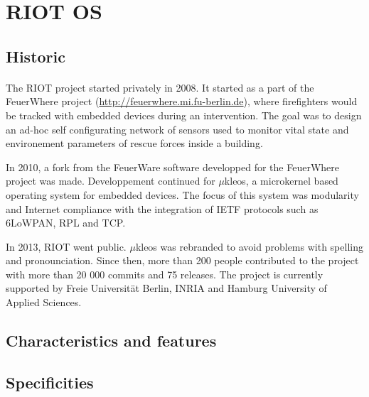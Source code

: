 \section{RIOT OS}

\subsection{Historic}
\paragraph{}
The RIOT project started privately in 2008.
It started as a part of the FeuerWhere project (\url{http://feuerwhere.mi.fu-berlin.de}), where firefighters would be tracked with embedded devices during an intervention.
The goal was to design an ad-hoc self configurating network of sensors used to monitor vital state and environement parameters of rescue forces inside a building.

In 2010, a fork from the FeuerWare software developped for the FeuerWhere project was made.
Developpement continued for $\mu$kleos, a microkernel based operating system for embedded devices.
The focus of this system was modularity and Internet compliance with the integration of IETF protocols such as 6LoWPAN, RPL and TCP.

In 2013, RIOT went public.
$\mu$kleos was rebranded to avoid problems with spelling and pronounciation.
Since then, more than 200 people contributed to the project with more than 20 000 commits and 75 releases.
The project is currently supported by Freie Universität Berlin, INRIA and Hamburg University of Applied Sciences.

\subsection{Characteristics and features}

\paragraph{}


\subsection{Specificities}
